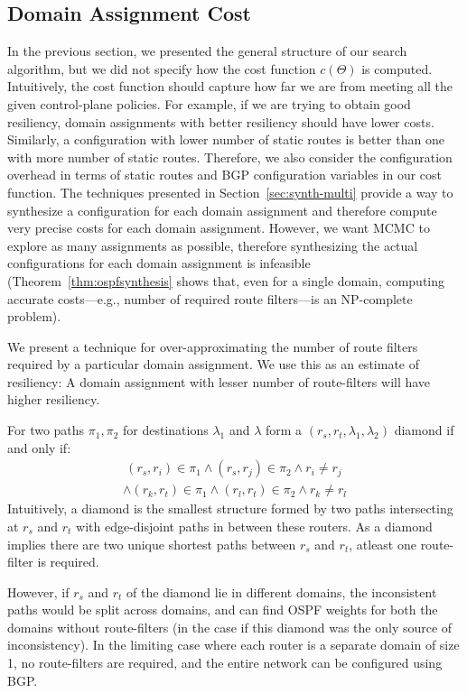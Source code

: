 \subsection{Domain Assignment Cost}
In the previous section, we presented the general structure of our search algorithm,
but we did not specify how the cost function $c(\Theta)$
is computed. Intuitively, the cost function should capture
how far we are from meeting all the given control-plane policies.
For example, if we are trying to obtain good resiliency,
domain assignments with better resiliency should have lower costs.
Similarly, a configuration with lower number of static routes is better
than one with more number of static routes. Therefore, we also consider 
the configuration overhead in terms of static routes and BGP configuration
variables in our cost function.
The techniques presented in Section~\ref{sec:synth-multi} provide a way to 
synthesize a configuration for each domain assignment and therefore compute
very precise costs for each domain assignment. 
However, 
we want MCMC to explore as many assignments as possible,
therefore 
synthesizing the actual configurations for
each domain assignment is infeasible (Theorem~\ref{thm:ospfsynthesis} shows that, 
even for a single domain, computing accurate costs---e.g., 
number of required route filters---is an NP-complete problem).


We present a technique for over-approximating the number of route 
filters required by a particular domain assignment. We use this 
as an estimate of resiliency: A domain assignment with lesser number
of route-filters will have higher resiliency. 

For two paths $\pi_1, \pi_2$ for destinations $\lambda_1$ and $\lambda$
form a $(r_s, r_t, \lambda_1, \lambda_2)$ diamond if and only if:
\begin{multline}
~(r_s,r_i) \in \pi_1 \wedge (r_s, r_j) \in \pi_2 \wedge r_i \not= r_j \\
\wedge (r_k,r_t) \in \pi_1 \wedge (r_l, r_t) \in \pi_2 \wedge r_k \not= r_l
\end{multline}
Intuitively, a diamond is the smallest structure formed by two
paths intersecting at $r_s$ and $r_t$ with edge-disjoint paths in 
between these routers. 
As a diamond 
implies there are two unique shortest paths between $r_s$ and $r_t$,
atleast one route-filter is required.

However, if $r_s$ and $r_t$ of the diamond lie in
different domains, the inconsistent paths would be split 
across domains, and \name can find OSPF weights for
both the domains without route-filters (in the case if this
diamond was the only source of inconsistency). In the limiting
case where each router is a separate domain of size 1,
no route-filters are required, and the entire 
network can be configured using BGP. 

